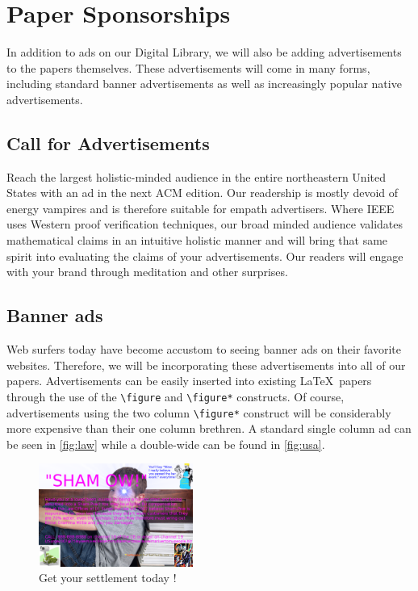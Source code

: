 \section{Paper Sponsorships}
\label{sec:sponsors}
In addition to ads on our Digital Library, we will also be adding
advertisements to the papers themselves.
These advertisements will come in many forms, including standard banner
advertisements as well as increasingly popular native advertisements.

\subsection{Call for Advertisements}
Reach the largest holistic-minded audience in the entire northeastern United
States with an ad in the next ACM edition.
Our readership is mostly devoid of energy vampires and is therefore suitable
for empath advertisers.
Where IEEE uses Western proof verification techniques, our broad minded
audience validates mathematical claims in an intuitive holistic manner and will
bring that same spirit into evaluating the claims of your advertisements.
Our readers will engage with your brand through meditation and other
surprises.

\subsection{Banner ads}
Web surfers today have become accustom to seeing banner ads on their favorite
websites.
Therefore, we will be incorporating these advertisements into all of our
papers.
Advertisements can be easily inserted into existing \LaTeX\ papers through the
use of the \texttt{\textbackslash figure} and \texttt{\textbackslash figure*}
constructs.
Of course, advertisements using the two column \texttt{\textbackslash figure*}
construct will be considerably more expensive than their one column brethren.
A standard single column ad can be seen in \autoref{fig:law} while a
double-wide can be found in \autoref{fig:usa}.

\begin{figure}
\centering
\includegraphics[width=0.45\textwidth]{figures/law-kid-ad.png}
\caption{Get your settlement today \cite{med-scale}!}
\label{fig:law}
\end{figure}

